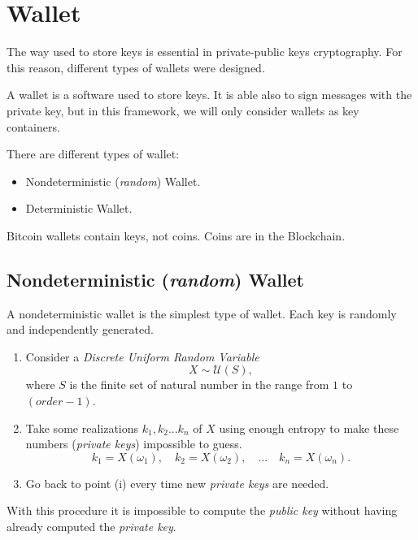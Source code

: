 \chapter{Wallet}

\label{wallet}

The way used to store keys is essential in private-public keys cryptography. For this reason, different types of wallets were designed.
\begin{definition}
	A wallet is a software used to store keys. It is able also to sign messages with the private key, but in this framework, we will only consider wallets as key containers. 
\end{definition}
There are different types of wallet:
\begin{itemize}
	\item Nondeterministic (\textit{random}) Wallet.
	\item Deterministic Wallet.
\end{itemize}

\begin{remark}
	Bitcoin wallets contain keys, not coins. Coins are in the Blockchain.
\end{remark}

\section{Nondeterministic (\textit{random}) Wallet}
A nondeterministic wallet is the simplest type of wallet. Each key is randomly and independently generated.

\begin{enumerate}[label=(\roman*)]
	\item Consider a \textit{Discrete Uniform Random Variable}
	\begin{equation*}
	X\sim \mathcal{U}(S),
	\end{equation*}
	where $S$ is the finite set of natural number in the range from $1$ to $(order-1)$.
	\item Take some realizations $k_1,k_2...k_n$ of $X$ using enough entropy to make these numbers (\textit{private keys}) impossible to guess.
	\begin{equation*}
	k_1=X(\omega_1), \quad  k_2=X(\omega_2), \quad ... \quad k_n=X(\omega_n).
	\end{equation*}
	\item Go back to point (i) every time new \textit{private keys} are needed.
\end{enumerate}
With this procedure it is impossible to compute the \textit{public key} without having already computed the \textit{private key}.


